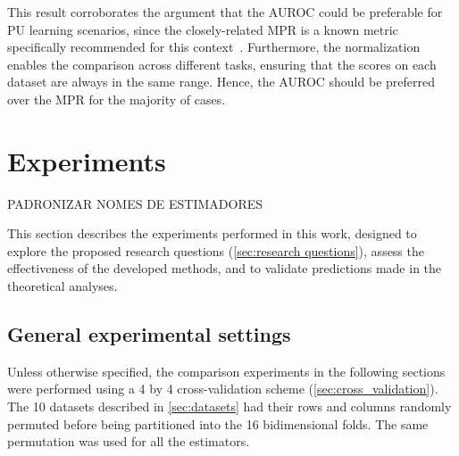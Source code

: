 This result corroborates the argument that the AUROC could be preferable for PU learning scenarios, since the closely-related MPR is a known metric specifically recommended for this context~\cite{pahikkala2015more,johnsonlogistic,hao2017predicting,yu2020fpscdtia}.
%
Furthermore, the normalization enables the comparison across different tasks, ensuring that the scores on each dataset are always in the same range. Hence, the AUROC should be preferred over the MPR for the majority of cases.

%



\section{Experiments}

PADRONIZAR NOMES DE ESTIMADORES  %

This section describes the experiments performed in this work, designed to explore the proposed research questions (\autoref{sec:research questions}), assess the effectiveness of the developed methods, and to validate predictions made in the theoretical analyses.


\subsection{General experimental settings}
\label{sec:exp settings}


Unless otherwise specified, the comparison experiments in the following sections were performed using a 4 by 4 cross-validation scheme (\autoref{sec:cross_validation}).
The 10 datasets described in \autoref{sec:datasets} had their rows and columns randomly permuted before being partitioned into the 16 bidimensional folds. The same permutation was used for all the estimators.

